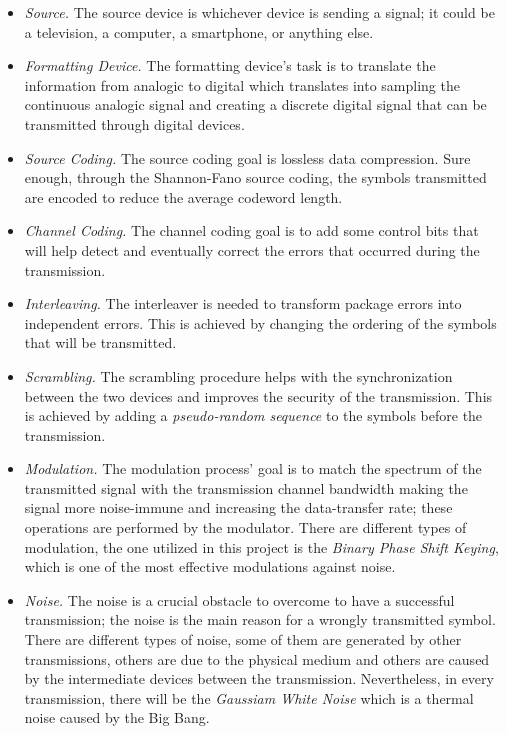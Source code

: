 \begin{itemize}
    \renewcommand{\labelitemi}{$\diamond$}
    \item \textsl{Source.} The source device is whichever device is sending a signal; it could be a television, a computer, a smartphone, or anything else.
    \item \textsl{Formatting Device.} The formatting device's task is to translate the information from analogic to digital which translates into sampling the continuous analogic signal and creating a discrete digital signal that can be transmitted through digital devices.
    \item \textsl{Source Coding.} The source coding goal is lossless data compression. Sure enough, through the Shannon-Fano source coding, the symbols transmitted are encoded to reduce the average codeword length.
    \item \textsl{Channel Coding.} The channel coding goal is to add some control bits that will help detect and eventually correct the errors that occurred during the transmission.
    \item \textsl{Interleaving.} The interleaver is needed to transform package errors into independent errors. This is achieved by changing the ordering of the symbols that will be transmitted.
    \item \textsl{Scrambling.} The scrambling procedure helps with the synchronization between the two devices and improves the security of the transmission. This is achieved by adding a \textit{pseudo-random sequence} to the symbols before the transmission.
    \item \textsl{Modulation.} The modulation process' goal is to match the spectrum of the transmitted signal with the transmission channel bandwidth making the signal more noise-immune and increasing the data-transfer rate; these operations are performed by the modulator. There are different types of modulation, the one utilized in this project is the \textsl{Binary Phase Shift Keying}, which is one of the most effective modulations against noise. 
    
    \item \textsl{Noise.} The noise is a crucial obstacle to overcome to have a successful transmission; the noise is the main reason for a wrongly transmitted symbol. There are different types of noise, some of them are generated by other transmissions, others are due to the physical medium and others are caused by the intermediate devices between the transmission. Nevertheless, in every transmission, there will be the \textsl{Gaussiam White Noise} which is a thermal noise caused by the Big Bang.

\end{itemize}
